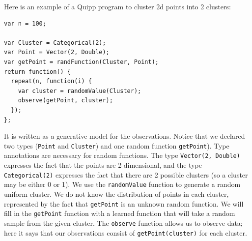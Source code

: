 \documentclass{article}
\begin{document}
  Here is an example of a Quipp program to cluster 2d points into 2 clusters:
  \lstset{language=JavaScript, xleftmargin=0.5in}

  \begin{lstlisting}
var n = 100;

var Cluster = Categorical(2);
var Point = Vector(2, Double);
var getPoint = randFunction(Cluster, Point);
return function() {
  repeat(n, function(i) {
    var cluster = randomValue(Cluster);
    observe(getPoint, cluster);
  });
};
  \end{lstlisting}

  It is written as a generative model for the observations.  Notice that
  we declared two types (\texttt{Point} and \texttt{Cluster}) and one
  random function \texttt{getPoint}).  Type annotations are necessary for random
  functions.  The type \texttt{Vector(2, Double)} expresses the fact that the
  points are 2-dimensional, and the type \texttt{Categorical(2)} expresses the
  fact that there are 2 possible clusters (so a cluster may be either 0 or 1).
  We use the \texttt{randomValue} function to generate a random uniform cluster. We do not know
  the distribution of points in each cluster, represented by the fact that \texttt{getPoint}
  is an unknown random function.  We will fill in the
  \texttt{getPoint} function with a learned function that will take a random
  sample from the given cluster.  The \texttt{observe} function allows us to
  observe data; here it says that our observations consist of \texttt{getPoint(cluster)} for
  each cluster.
\end{document}
